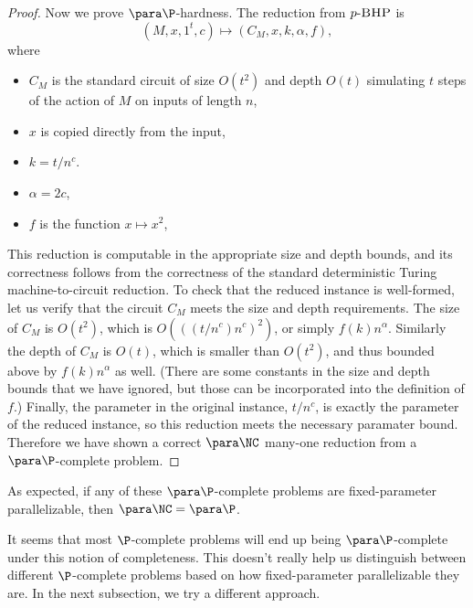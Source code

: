 \documentclass{article}
\newcommand{\dash}{\textnormal{-}}
\newcommand{\pBHP}{p \dash \textsc{BHP}}
\newcommand{\pSCE}{p \dash \textsc{SCE}}
\begin{document}
\begin{proof}

  Now we prove $\para \P$-hardness.
  The reduction from $\pBHP$ is
  \[
  (M, x, 1^t, c) \mapsto (C_M, x, k, \alpha, f),
  \]
  where
  \begin{itemize}
  \item $C_M$ is the standard circuit of size $O(t^2)$ and depth $O(t)$ simulating $t$ steps of the action of $M$ on inputs of length $n$,
  \item $x$ is copied directly from the input,
  \item $k = t / n^c$.
  \item $\alpha = 2c$,
  \item $f$ is the function $x \mapsto x^2$,
  \end{itemize}
  This reduction is computable in the appropriate size and depth bounds, and its correctness follows from the correctness of the standard deterministic Turing machine-to-circuit reduction.
  To check that the reduced instance is well-formed, let us verify that the circuit $C_M$ meets the size and depth requirements.
  The size of $C_M$ is $O(t^2)$, which is $O(((t / n^c) n^c)^2)$, or simply $f(k) n^\alpha$.
  Similarly the depth of $C_M$ is $O(t)$, which is smaller than $O(t^2)$, and thus bounded above by $f(k) n^\alpha$ as well.
  (There are some constants in the size and depth bounds that we have ignored, but those can be incorporated into the definition of $f$.)
  Finally, the parameter in the original instance, $t / n^c$, is exactly the parameter of the reduced instance, so this reduction meets the necessary paramater bound.
  Therefore we have shown a correct $\para \NC$ many-one reduction from a $\para \P$-complete problem.
\end{proof}

As expected, if any of these $\para \P$-complete problems are fixed-parameter parallelizable, then $\para \NC = \para \P$.

It seems that most $\P$-complete problems will end up being $\para \P$-complete under this notion of completeness.
This doesn't really help us distinguish between different $\P$-complete problems based on how fixed-parameter parallelizable they are.
In the next subsection, we try a different approach.
\end{document}
